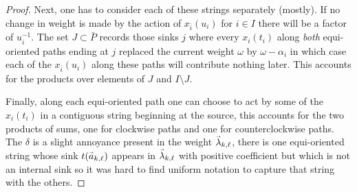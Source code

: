 \documentclass[12pt]{amsart}
\renewcommand{\vec}[1]{\accentset{\shortrightarrow}{#1}}
\numberwithin{equation}{section}
\begin{document}
{\begin{proof}
    Next, one has to consider each of these strings separately (mostly).  If no change in weight is made by the action of $x_{\bar{i}}(u_i)$ for $i\in I$ there will be a factor of $u_i^{-1}$.  The set $J\subset\bar{P}$ records those sinks $j$ where every $x_i(t_i)$ along \emph{both} equi-oriented paths ending at $j$ replaced the current weight $\omega$ by $\omega-\alpha_i$ in which case each of the $x_{\bar{i}}(u_i)$ along these paths will contribute nothing later.  This accounts for the products over elements of $J$ and $I\setminus J$.

    Finally, along each equi-oriented path one can choose to act by some of the $x_i(t_i)$ in a contiguous string beginning at the source, this accounts for the two products of sums, one for clockwise paths and one for counterclockwise paths.  The $\delta$ is a slight annoyance present in the weight $\vec{\lambda}_{k,\ell}$, there is one equi-oriented string whose sink $t(\vec{a}_{k,\ell})$ appears in $\vec{\lambda}_{k,\ell}$ with positive coefficient but which is not an internal sink so it was hard to find uniform notation to capture that string with the others.
  \end{proof}}%
\end{document}
